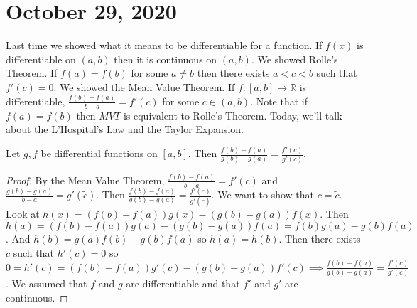\documentclass{article}
\newcommand{\R}{\mathbb{R}}
\newcommand{\ra}[1][]{\xrightarrow{#1}}
\begin{document}
\section{October 29, 2020}
Last time we showed what it means to be differentiable for a function. If $f(x)$ is differentiable on $(a,b)$ then it is continuous on $(a,b)$. We showed Rolle's Theorem. If $f(a)=f(b)$ for some $a\neq b$ then there exists $a<c<b$ such that $f'(c)=0$. We showed the Mean Value Theorem. If $f:[a,b]\ra\R$ is differentiable, $\frac{f(b)-f(a)}{b-a}=f'(c)$ for some $c\in(a,b)$. Note that if $f(a)=f(b)$ then $MVT$ is equivalent to Rolle's Theorem. Today, we'll talk about the L'Hospital's Law and the Taylor Expansion.
\begin{proposition}
Let $g,f$ be differential functions on $[a,b]$. Then $\frac{f(b)-f(a)}{g(b)-g(a)}=\frac{f'(c)}{g'(c)}$.
\end{proposition}
\begin{proof}
By the Mean Value Theorem, $\frac{f(b)-f(a)}{b-a}=f'(c)$ and $\frac{g(b)-g(a)}{b-a}=g'(\tilde{c})$. Then $\frac{f(b)-f(a)}{g(b)-g(a)}=\frac{f'(c)}{g'(\tilde{c})}$. We want to show that $c=\tilde{c}$. Look at $h(x)=(f(b)-f(a))g(x)-(g(b)-g(a))f(x)$. Then $h(a)=(f(b)-f(a))g(a)-(g(b)-g(a))f(a)=f(b)g(a)-g(b)f(a)$. And $h(b)=g(a)f(b)-g(b)f(a)$ so $h(a)=h(b)$. Then there exists $c$ such that $h'(c)=0$ so $0=h'(c)=(f(b)-f(a))g'(c)-(g(b)-g(a))f'(c)\implies \frac{f(b)-f(a)}{g(b)-g(a)}=\frac{f'(c)}{g'(c)}$. We assumed that $f$ and $g$ are differentiable and that $f'$ and $g'$ are continuous.
\end{proof}
\end{document}
